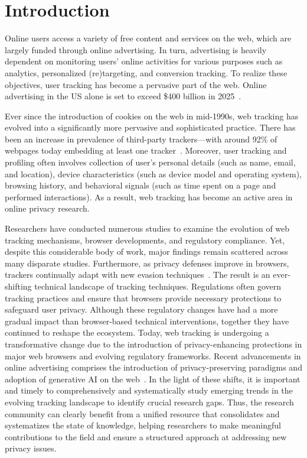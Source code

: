 \section{Introduction}
\label{sec:introduction}

Online users access a variety of free content and services on the web, which are largely funded through online advertising.
%
In turn, advertising is heavily dependent on monitoring users' online activities for various purposes 
%
such as analytics, personalized (re)targeting, and conversion tracking.
%
To realize these objectives, user tracking has become a pervasive part of the web.
%
Online advertising in the US alone is set to exceed \$400 billion in 2025~\cite{adSpendEmarketer2025}.

Ever since the introduction of cookies on the web in mid-1990s, web tracking has evolved into a significantly more pervasive  and sophisticated practice.
%
There has been an increase in prevalence of third-party trackers---with around 92\% of webpages today embedding at least one tracker~\cite{urban2024WebAlmanac2024}.
%
Moreover, user tracking and profiling often involves collection of user's personal details (such as name, email, and location), device characteristics (such as device model and operating system), browsing history, and behavioral signals (such as time spent on a page and performed interactions).
%
As a result, web tracking has become an active area in online privacy research.


Researchers have conducted numerous studies to examine the evolution of web tracking mechanisms, browser developments, and regulatory compliance. 
%
Yet, despite this considerable body of work, major findings remain scattered across many disparate studies.
%
Furthermore, as privacy defenses improve in browsers, trackers continually adapt with new evasion techniques~\cite{narayanan2018web}.
%
The result is an ever-shifting technical landscape of tracking techniques.
%
Regulations often govern tracking practices and ensure that browsers provide necessary protections to safeguard user privacy.
%
Although these regulatory changes have had a more gradual impact than browser-based technical interventions, together they have continued to reshape the ecosystem. 
%
Today, web tracking is undergoing a transformative change due to the introduction of privacy-enhancing  protections in major web browsers and evolving regulatory frameworks.
%
Recent advancements in online advertising comprises the introduction of privacy-preserving paradigms and adoption of generative AI on the web~\cite{builtin-ai,chavezUpdatePlansPrivacy2025}.
%
In the light of these shifts, it is important and timely to comprehensively and systematically study emerging trends in the evolving tracking landscape to identify crucial research gaps.
%
Thus, the research community can clearly benefit from a unified resource that consolidates and systematizes the state of knowledge, helping researchers to make meaningful contributions to the field and ensure a structured approach at addressing new privacy issues.

